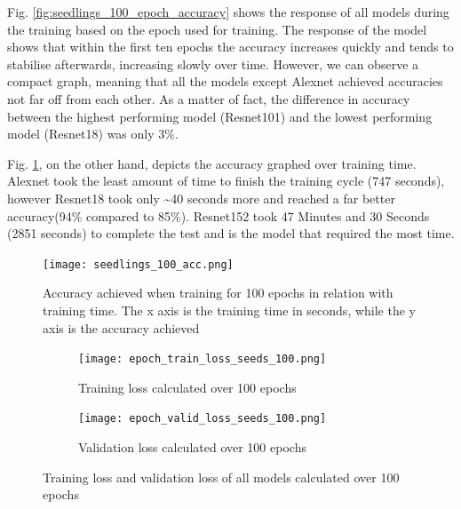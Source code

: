 Fig. \ref{fig:seedlings_100_epoch_accuracy} shows the response of all models during the training based on the epoch used for training. The response of the model shows that within the first ten epochs the accuracy increases quickly and tends to stabilise afterwards, increasing slowly over time. However, we can observe a compact graph, meaning that all the models except Alexnet achieved accuracies not far off from each other.
As a matter of fact, the difference in accuracy between the highest performing model (Resnet101) and the lowest performing model (Resnet18) was only 3\%.  


Fig. \ref{fig:seedlings_100_acc}, on the other hand, depicts the accuracy graphed over training time. Alexnet took the least amount of time to finish the training cycle (747 seconds), however Resnet18 took only \textasciitilde40 seconds more and reached a far better accuracy(94\% compared to 85\%). Resnet152 took 47 Minutes and 30 Seconds (2851 seconds) to complete the test and is the model that required the most time. \\
\begin{figure}[h]
       \centering 
	    \texttt{[image: seedlings\_100\_acc.png]}
        \caption[Accuracy achieved when training for 100 epochs in relation with training time]{Accuracy achieved when training for 100 epochs in relation with training time. The x axis is the training time in seconds, while the y axis is the accuracy achieved}
         \label{fig:seedlings_100_acc}
\end{figure}

\begin{figure}[h]
\begin{subfigure}{0.5\textwidth}
	    \texttt{[image: epoch\_train\_loss\_seeds\_100.png]}
	    \caption{Training loss calculated over 100 epochs}
        \label{fig:train_loss_seeds_100}
     \end{subfigure} \hfill
     \begin{subfigure}{0.5\textwidth}
	    \texttt{[image: epoch\_valid\_loss\_seeds\_100.png]}
	    \caption{Validation loss calculated over 100 epochs}
         \label{fig:valid_loss_seeds_100}
     \end{subfigure}
     
     \caption{Training loss and validation loss of all models calculated over 100 epochs}
        \label{fig:tran_valid_loss_seeds_100}
        
      
\end{figure}

